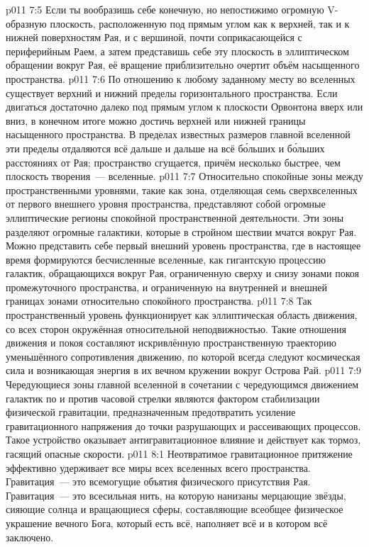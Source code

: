 \vs p011 7:5 Если ты вообразишь себе конечную, но непостижимо огромную V\hyp{}образную плоскость, расположенную под прямым углом как к верхней, так и к нижней поверхностям Рая, и с вершиной, почти соприкасающейся с периферийным Раем, а затем представишь себе эту плоскость в эллиптическом обращении вокруг Рая, её вращение приблизительно очертит объём насыщенного пространства.
\vs p011 7:6 По отношению к любому заданному месту во вселенных существует верхний и нижний пределы горизонтального пространства. Если двигаться достаточно далеко под прямым углом к плоскости Орвонтона вверх или вниз, в конечном итоге можно достичь верхней или нижней границы насыщенного пространства. В пределах известных размеров главной вселенной эти пределы отдаляются всё дальше и дальше на всё б\'ольших и б\'ольших расстояниях от Рая; пространство сгущается, причём несколько быстрее, чем плоскость творения~--- вселенные.
\vs p011 7:7 \pc Относительно спокойные зоны между пространственными уровнями, такие как зона, отделяющая семь сверхвселенных от первого внешнего уровня пространства, представляют собой огромные эллиптические регионы спокойной пространственной деятельности. Эти зоны разделяют огромные галактики, которые в стройном шествии мчатся вокруг Рая. Можно представить себе первый внешний уровень пространства, где в настоящее время формируются бесчисленные вселенные, как гигантскую процессию галактик, обращающихся вокруг Рая, ограниченную сверху и снизу зонами покоя промежуточного пространства, и ограниченную на внутренней и внешней границах зонами относительно спокойного пространства.
\vs p011 7:8 Так пространственный уровень функционирует как эллиптическая область движения, со всех сторон окружённая относительной неподвижностью. Такие отношения движения и покоя составляют искривлённую пространственную траекторию уменьшённого сопротивления движению, по которой всегда следуют космическая сила и возникающая энергия в их вечном кружении вокруг Острова Рай.
\vs p011 7:9 Чередующиеся зоны главной вселенной в сочетании с чередующимся движением галактик по и против часовой стрелки являются фактором стабилизации физической гравитации, предназначенным предотвратить усиление гравитационного напряжения до точки разрушающих и рассеивающих процессов. Такое устройство оказывает антигравитационное влияние и действует как тормоз, гасящий опасные скорости.
\vs p011 8:1 Неотвратимое гравитационное притяжение эффективно удерживает все миры всех вселенных всего пространства. Гравитация~--- это всемогущие объятия физического присутствия Рая. Гравитация~--- это всесильная нить, на которую нанизаны мерцающие звёзды, сияющие солнца и вращающиеся сферы, составляющие всеобщее физическое украшение вечного Бога, который есть всё, наполняет всё и в котором всё заключено.
